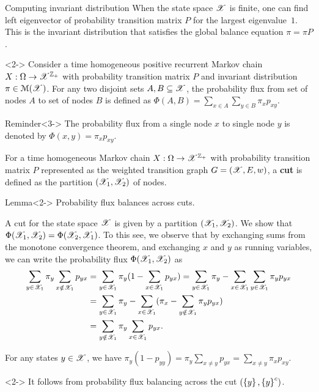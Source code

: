 \documentclass[12pt,aspectratio=169]{beamer}
\begin{document}
\begin{frame}{Computing invariant distribution}
When the state space $\mathscr{X}$ is finite, one can find left eigenvector of probability transition matrix $P$ for the largest eigenvalue~$1$. 
This is the invariant distribution that satisfies the global balance equation $\pi = \pi P$. 
\begin{Definition}<2->
Consider a time homogeneous positive recurrent Markov chain $X:\Omega\to\mathscr{X}^{\mathbb{Z}_+}$ with probability transition matrix $P$ and invariant distribution $\pi \in \mathcal{M}(\mathscr{X})$. 
For any two disjoint sets $A, B \subseteq \mathscr{X}$,  
the probability flux from set of nodes $A$ to set of nodes $B$ is defined as $\Phi(A,B) =\sum_{x \in A}\sum_{y \in B}\pi_xp_{xy}$. 
\end{Definition}
\begin{block}{Reminder}<3->
The probability flux from a single node $x$ to single node $y$ is denoted by $\Phi(x,y) = \pi_xp_{xy}$. 
\end{block}
\end{frame}

\begin{frame}
\begin{Definition} 
For a time homogeneous Markov chain $X:\Omega\to\mathscr{X}^{\mathbb{Z}_+}$ with probability transition matrix $P$ 
represented as the weighted transition graph $G = (\mathscr{X}, E, w)$, 
a \textbf{cut} is defined as the partition $(\mathscr{X}_1,\mathscr{X}_2)$ of nodes.
\end{Definition}
\begin{block}{Lemma}<2->
Probability flux balances across cuts. 
\end{block}
\end{frame}

\begin{frame}
\begin{Proof}
A cut for the state space $\mathscr{X}$ is given by a partition $(\mathscr{X}_1,\mathscr{X}_2)$. 
We show that $\Phi(\mathscr{X}_1,\mathscr{X}_2) = \Phi(\mathscr{X}_2,\mathscr{X}_1)$. 
To this see, we observe that by exchanging sums from the monotone convergence theorem, and exchanging $x$ and $y$ as running variables, we can write the probability flux $\Phi(\mathscr{X}_1,\mathscr{X}_2)$ as 
\begin{align*}
\sum_{y\in \mathscr{X}_1}\pi_y\sum_{x\notin\mathscr{X}_1}p_{yx} 
&= \sum_{y\in\mathscr{X}_1}\pi_y(1- \sum_{x\in\mathscr{X}_1}p_{yx}) 
= \sum_{y\in\mathscr{X}_1}\pi_y - \sum_{x\in\mathscr{X}_1}\sum_{y\in\mathscr{X}_1}\pi_yp_{yx} \\
&= \sum_{y\in\mathscr{X}_1}\pi_y - \sum_{x\in\mathscr{X}_1}(\pi_x- \sum_{y\notin\mathscr{X}_1}\pi_yp_{yx}) \\
&= \sum_{y\notin \mathscr{X}_1}\pi_y\sum_{x\in\mathscr{X}_1}p_{yx}.
\end{align*}
\end{Proof}
\end{frame}

\begin{frame}
\begin{cor}
For any states $y \in \mathscr{X}$, we have $\pi_y(1-p_{yy}) = \pi_y \sum_{x \neq y}p_{yx} = \sum_{x \neq y}\pi_xp_{xy}$. 
\end{cor}
\begin{Proof}<2->
It follows from probability flux balancing across the cut $(\left\{y\right\}, \left\{y\right\}^c)$. 
\end{Proof}
\end{frame}
\end{document}
